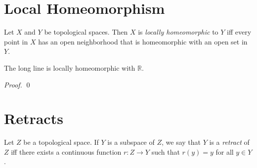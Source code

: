 \section{Local Homeomorphism}

\begin{df}
  Let $X$ and $Y$ be topological spaces. Then $X$ is \emph{locally
    homeomorphic} to $Y$ iff every point in $X$ has an open neighborhood that
  is homeomorphic with an open set in $Y$.
\end{df}

\begin{prop}
  The long line is locally homeomorphic with $\mathbb{R}$.
\end{prop}

\begin{proof}
  \pf
  \qed
\end{proof}

\section{Retracts}

 \begin{df}[Retract]
Let $Z$ be a topological space. If $Y$ is a subspace of $Z$, we say that $Y$
is a \emph{retract} of $Z$ iff there exists a continuous function $r : Z
\rightarrow Y$ such that $r(y) = y$ for all $y \in Y$.
\end{df}
